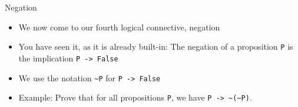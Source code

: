 \begin{frame}[fragile]{Negation}
\begin{itemize}
  \item We now come to our fourth logical connective, negation

  \pause

  \item You have seen it, as it is already built-in: The negation of a proposition \lstinline|P| is the implication \lstinline|P -> False|

  \pause

  \item We use the notation \lstinline|~P| for \lstinline|P -> False|

  \pause

  \item Example: Prove that for all propositions \lstinline|P|, we have \lstinline|P -> ~(~P)|.

\end{itemize}
\end{frame}


